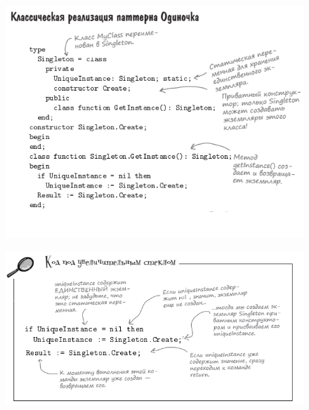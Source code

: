 \documentclass{beamer}
\begin{document}
\begin{frame}
\begin{figure}[h]
\centering
\includegraphics[scale=0.7]{images/lec11-pic12.png}
\label{pic-sort}
\end{figure}
\end{frame}

\begin{frame}
\begin{figure}[h]
\centering
\includegraphics[scale=0.7]{images/lec11-pic13.png}
\label{pic-sort}
\end{figure}
\end{frame}
\end{document}
